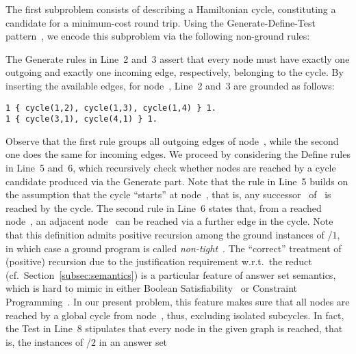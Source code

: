 The first subproblem consists of describing a Hamiltonian cycle,
constituting a candidate for a minimum-cost round trip.
Using the Generate-Define-Test pattern~\cite{lifschitz02a},
we encode this subproblem via the following non-ground rules:
%

%
The Generate rules in Line~2 and~3 assert that every node must have
exactly one outgoing and exactly one incoming edge, respectively,
belonging to the cycle.
By inserting the available edges, for node~,
Line~2 and~3 are grounded as follows:%
%
\begin{lstlisting}[numbers=none]
1 { cycle(1,2), cycle(1,3), cycle(1,4) } 1.
1 { cycle(3,1), cycle(4,1) } 1.
\end{lstlisting}
%
Observe that the first rule groups all outgoing edges of node~,
while the second one does the same for incoming edges.
We proceed by considering the Define rules in Line~5 and~6,
which recursively check whether nodes are reached by a cycle candidate
produced via the Generate part.
Note that the rule in Line~5 builds on the assumption that the cycle
``starts'' at node~, that is,
any successor~ of~ is reached by the cycle.
The second rule in Line~6 states that, from a reached node~,
an adjacent node~ can be reached via a further edge in the cycle.
Note that this definition admits positive recursion
among the ground instances of /$1$,
in which case a ground program is called \emph{non-tight}~\cite{erdlif03a,fages94a}.
The ``correct'' treatment of (positive) recursion due to the justification
requirement w.r.t.\ the reduct (cf.\ Section~\ref{subsec:semantics})
is a particular feature of answer set semantics,
which is hard to mimic in either
Boolean Satisfiability~\cite{bihemawa08a} or
Constraint Programming~\cite{robewa06a}.
In our present problem, this feature makes sure that all nodes are reached
by a global cycle from node~, thus, excluding isolated subcycles.
In fact, the Test in Line~8 stipulates that every node in the given graph
is reached, that is, the instances of /$2$ in an answer set

